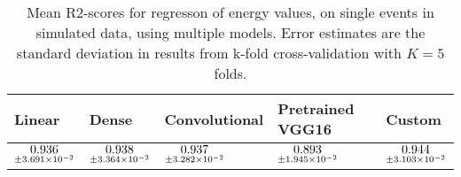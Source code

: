 \begin{table}
\centering
\caption{
Mean R2-scores for regresson of energy values, on single events in simulated data, using multiple models. 
Error estimates are the standard deviation in results from k-fold cross-validation 
with $K=5$ folds.
}
\label{tab:regression-simulated-single-energy-r2}
\begin{tabular}{lllll}
\toprule
                                             Linear &                                               Dense &                                       Convolutional &                                    Pretrained VGG16 &                                              Custom \\
\midrule
 $\underset{\num{+- 3.691e-02 }  }{\num{ 0.936 } }$ &  $\underset{\num{+- 3.364e-02 }  }{\num{ 0.938 } }$ &  $\underset{\num{+- 3.282e-02 }  }{\num{ 0.937 } }$ &  $\underset{\num{+- 1.945e-02 }  }{\num{ 0.893 } }$ &  $\underset{\num{+- 3.103e-02 }  }{\num{ 0.944 } }$ \\
\bottomrule
\end{tabular}
\end{table}
